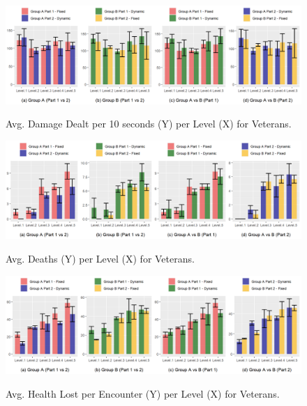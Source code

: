 \begin{figure}[!ht]
    \begin{center}
    \caption{Avg. Damage Dealt per 10 seconds (Y) per Level (X) for Veterans.}
        \includegraphics[width=\textwidth]{figures/damage_dealt_per_10s-veteran_players.png}
        \label{fig:result-metric-veterans-damage-dealt-per-10s}
    \end{center}
\end{figure}

\begin{figure}[!ht]
    \begin{center}
    \caption{Avg. Deaths (Y) per Level (X) for Veterans.}
        \includegraphics[width=\textwidth]{figures/deaths_per_level-veteran_players.png}
        \label{fig:result-metric-veterans-deaths-per-level}
    \end{center}
\end{figure}

\begin{figure}[!ht]
    \begin{center}
    \caption{Avg. Health Lost per Encounter (Y) per Level (X) for Veterans.}
        \includegraphics[width=\textwidth]{figures/health_lost_per_encounter-veteran_players.png}
        \label{fig:result-metric-veterans-health-lost-per-encounter}
    \end{center}
\end{figure}

